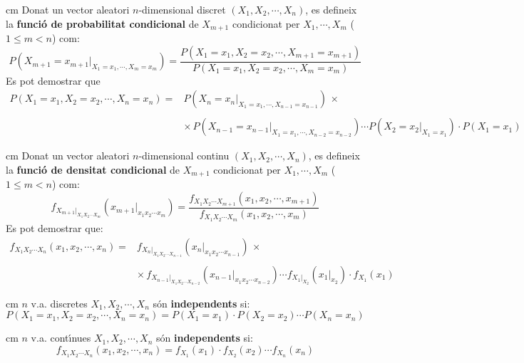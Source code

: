 \documentclass{article}
\begin{document}
 cm
Donat un vector aleatori $n$-dimensional discret $(X_1, X_2, \cdots, X_n)$, es defineix la 
\textbf{funci\'o de pro\-ba\-bi\-li\-tat condicional} de $X_{m+1}$ condicionat per $X_1, \cdots, X_m$ ($1 \leq m < n$)
com:
\[
P(X_{m+1}=x_{m+1} |_{X_1=x_1, \cdots, X_m=x_m})=
\frac{ P(X_1=x_1, X_2=x_2, \cdots, X_{m+1}=x_{m+1}) }{ P(X_1=x_1, X_2=x_2, \cdots, X_{m}=x_{m}) }
\]
\noindent
Es pot demostrar que
\[
\begin{array}{rl}
P(X_1 = x_1, X_2 = x_2, \cdots, X_n = x_n) = & P(X_{n}=x_{n} |_{X_1=x_1, \cdots, X_{n-1}=x_{n-1}}) \, \times \\ \\
 & \times \, P(X_{n-1}=x_{n-1} |_{X_1=x_1, \cdots, X_{n-2}=x_{n-2}}) \cdots P(X_2=x_2 |_{X_1=x_1}) \cdot P(X_1=x_1) 
\end{array}
\]

 cm
Donat un vector aleatori $n$-dimensional continu $(X_1, X_2, \cdots, X_n)$, es defineix la 
\textbf{funci\'o de densitat condicional} de $X_{m+1}$ condicionat per $X_1, \cdots, X_m$ ($1 \leq m < n$)
com:
\[
f_{X_{m+1}|_{X_1 X_2 \cdots X_m}}(x_{m+1}|_{x_1 x_2 \cdots x_m})=
\frac{ f_{X_1 X_2 \cdots X_{m+1}} (x_1, x_2, \cdots, x_{m+1})}{ f_{X_1 X_2 \cdots X_{m}} (x_1, x_2, \cdots, x_{m}) }
\]
\noindent
Es pot demostrar que:
\[
\begin{array}{rl}
f_{X_1 X_2 \cdots X_{n}} (x_1, x_2, \cdots, x_{n})= &
f_{X_{n}|_{X_1 X_2 \cdots X_{n-1}}}(x_{n}|_{x_1 x_2 \cdots x_{n-1}}) \, \times \\ \\
 & \times \, f_{X_{n-1}|_{X_1 X_2 \cdots X_{n-2}}}(x_{n-1}|_{x_1 x_2 \cdots x_{n-2}}) \cdots
f_{X_1 |_{X_2}}(x_1 |_{x_2}) \cdot f_{X_1}(x_1)
\end{array}
\]

 cm
$n$ v.a. discretes $X_1, X_2, \cdots, X_n$ s\'on \textbf{independents} si:
\[
P(X_1 = x_1, X_2 = x_2, \cdots, X_n = x_n) =P(X_1 = x_1) \cdot P(X_2 = x_2) \cdots P(X_n=x_n)
\]

 cm
$n$ v.a. cont\'\i nues $X_1, X_2, \cdots, X_n$ s\'on \textbf{independents} si:
\[
f_{X_1 X_2 \cdots X_{n}} (x_1, x_2, \cdots, x_{n})=f_{X_1}(x_1) \cdot f_{X_2}(x_2) \cdots f_{X_n}(x_n)
\]
\end{document}
